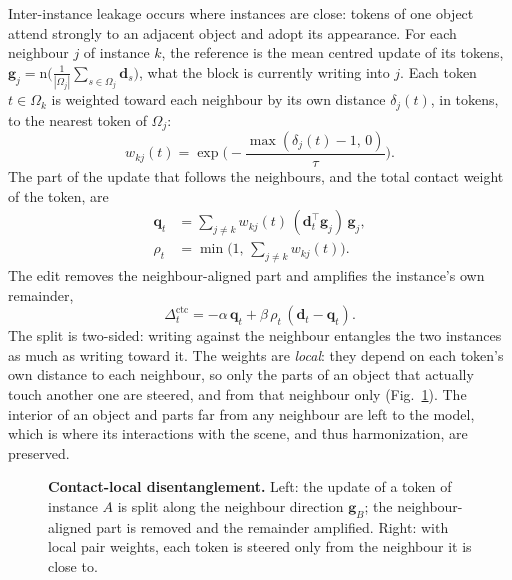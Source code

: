 Inter-instance leakage occurs where instances are close: tokens of one object attend strongly to an adjacent
object and adopt its appearance. For each neighbour $j$ of instance $k$, the reference is the mean centred
update of its tokens,
$\mathbf{g}_j = \mathrm{n}\big(\frac{1}{|\Omega_j|}\sum_{s\in\Omega_j}\mathbf{d}_s\big)$,
\ie what the block is currently writing into $j$. Each token $t \in \Omega_k$ is weighted toward each
neighbour by its own distance $\delta_j(t)$, in tokens, to the nearest token of $\Omega_j$:
\begin{equation}
  w_{kj}(t) = \exp\!\Big(-\frac{\max(\delta_j(t) - 1,\,0)}{\tau}\Big) .
  \label{eq:contact_weights}
\end{equation}
The part of the update that follows the neighbours, and the total contact weight of the token, are
\begin{align}
  \mathbf{q}_t &= \sum_{j \neq k} w_{kj}(t)\,(\mathbf{d}_t^{\top}\mathbf{g}_j)\,\mathbf{g}_j , \\
  \rho_t &= \min\!\Big(1,\, \sum_{j \neq k} w_{kj}(t)\Big) .
\end{align}
The edit removes the neighbour-aligned part and amplifies the instance's own remainder,
\begin{equation}
  \Delta^{\mathrm{ctc}}_t = -\alpha\,\mathbf{q}_t + \beta\,\rho_t\,(\mathbf{d}_t - \mathbf{q}_t) .
\end{equation}
The split is two-sided: writing against the neighbour entangles the two instances as much as writing toward
it. The weights are \emph{local}: they depend on each token's own distance to each neighbour, so only the parts
of an object that actually touch another one are steered, and from that neighbour only
(Fig.~\ref{fig:contact}). The interior of an object and parts far from any neighbour are left to the model,
which is where its interactions with the scene, and thus harmonization, are preserved.

\begin{figure}[t]
  \centering
  \caption{\textbf{Contact-local disentanglement.} Left: the update of a token of instance $A$ is split along
  the neighbour direction $\mathbf{g}_B$; the neighbour-aligned part is removed and the remainder amplified.
  Right: with local pair weights, each token is steered only from the neighbour it is close to.}
  \label{fig:contact}
\end{figure}

